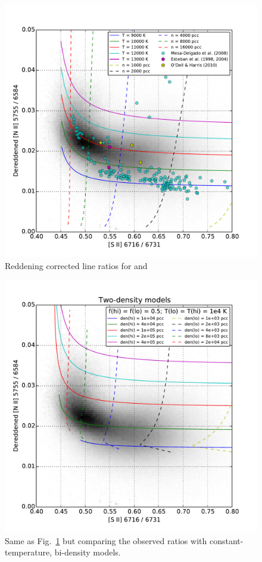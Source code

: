 \documentclass[preprint]{aastex}
\begin{document}
\begin{figure}
  \centering
  \includegraphics{nii-deredden-vs-sii-ratios}
  \caption{Reddening corrected line ratios for \sii{} and \nii{}}
  \label{fig:deredden}
\end{figure}

\begin{figure}
  \centering
  \includegraphics{nii-sii-ratios-two-phase}
  \caption{Same as Fig.~\ref{fig:deredden} but comparing the observed
    ratios with constant-temperature, bi-density models.}
  \label{fig:two-phase}
\end{figure}
\end{document}
